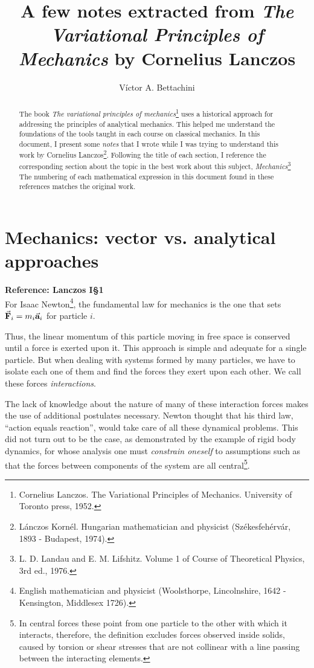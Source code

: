 \documentclass[12pt, english, a4paper]{article}
\title{A few notes extracted from \emph{The Variational Principles of Mechanics} by Cornelius Lanczos}
\author{Víctor A. Bettachini}
\date{}
\begin{document}
\maketitle

\begin{abstract}
    The book \emph{The variational principles of mechanics}\footnote{Cornelius Lanczos. The Variational Principles of Mechanics. University of Toronto press, 1952.
    } uses a historical approach for addressing the principles of analytical mechanics.
    This helped me understand the foundations of the tools taught in each course on classical mechanics.
    In this document, I present some \emph{notes} that I wrote while I was trying to understand this work by Cornelius Lanczos\footnote{Lánczos Kornél. Hungarian mathematician and physicist (Székesfehérvár, 1893 - Budapest, 1974).}.
    Following the title of each section, I reference the corresponding section about the topic in the best work about this subject, \emph{Mechanics}\footnote{L. D. Landau and E. M. Lifshitz. Volume 1 of Course of Theoretical Physics, 3rd ed., 1976.} The numbering of each mathematical expression in this document found in these references matches the original work.
\end{abstract}


\tableofcontents

\section{Mechanics: vector vs. analytical approaches}
\textbf{Reference: Lanczos I\S1}\\

For Isaac Newton\footnote{English mathematician and physicist (Woolsthorpe, Lincolnshire, 1642 - Kensington, Middlesex 1726).}, the fundamental law for mechanics is the one that sets \(\va{F}_i= m_i \va{a}_i\) for particle \(i\).

Thus, the linear momentum of this particle moving in free space is conserved until a force is exerted upon it. This approach is simple and adequate for a single particle.
But when dealing with systems formed by many particles, we have to isolate each one of them and find the forces they exert upon each other. We call these forces \emph{interactions}.

The lack of knowledge about the nature of many of these interaction forces makes the use of additional postulates necessary.
Newton thought that his third law, ``action equals reaction'', would take care of all these dynamical problems.
This did not turn out to be the case, as demonstrated by the example of rigid body dynamics, for whose analysis one must \emph{constrain oneself} to assumptions such as that the forces between components of the system are all central\footnote{In central forces these point from one particle to the other with which it interacts, therefore, the definition excludes forces observed inside solids, caused by torsion or shear stresses that are not collinear with a line passing between the interacting elements.}.
\end{document}
